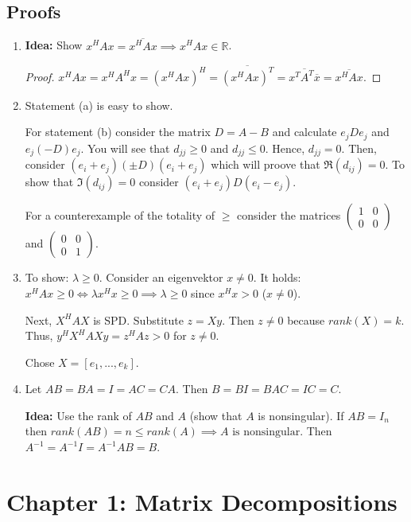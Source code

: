 \documentclass[a4paper, landscape,twocolumn,fontsize=9pt]{scrartcl}
\begin{document}
\subsection*{Proofs}
\begin{enumerate}
    \item \textbf{Idea:} Show $x^HAx = \overline{x^HAx} \implies x^HAx \in \mathbb R$. \begin{proof}
        $x^HAx = x^HA^Hx = (x^HAx)^H = \overline{(x^HAx)^T} = \overline{x^TA^T \overline{x}} = \overline{x^HAx}$.
    \end{proof}
    
    \item Statement (a) is easy to show. 
    
    For statement (b) consider the matrix $D = A-B$ and calculate $e_jDe_j$ and $e_j(-D)e_j$. You will see that $d_{jj} \geq 0$ and $d_{jj} \leq 0$. Hence, $d_{jj} = 0$. Then, consider $(e_i+e_j) (\pm D) (e_i + e_j)$ which will proove that $\Re(d_{ij}) = 0$. To show that $\Im(d_{ij}) = 0$ consider $(e_i + e_j)D(e_i - e_j)$. 
    
    For a counterexample of the totality of $\geq$ consider the matrices $\begin{pmatrix} 1& 0 \\ 0 & 0 \end{pmatrix}$ and $\begin{pmatrix} 0 & 0 \\ 0 & 1 \end{pmatrix}$.
    
    \item To show: $\lambda \geq 0$. Consider an eigenvektor $x \neq 0$. It holds: $x^HAx \geq 0 \iff \lambda x^Hx \geq 0 \implies \lambda \geq 0$ since $x^Hx > 0$ ($x \neq 0$).
    
    Next, $X^HAX$ is SPD. Substitute $z = Xy$. Then $z \neq 0$ because $rank(X) = k$. Thus, $y^HX^HAXy = z^HAz > 0$ for $z \neq 0$.
    
    Chose $X = [e_1,...,e_k]$.
    
    \item Let $AB = BA = I = AC = CA$. Then $B = BI = BAC = IC = C$.
    
    \textbf{Idea:} Use the rank of $AB$ and $A$ (show that $A$ is nonsingular). If $AB = I_n$ then $rank(AB) = n \leq rank(A) \implies A \text{ is nonsingular}$. Then $A^{-1} = A^{-1} I = A^{-1}AB = B$.
\end{enumerate}

\section*{Chapter 1: Matrix Decompositions}
\end{document}
